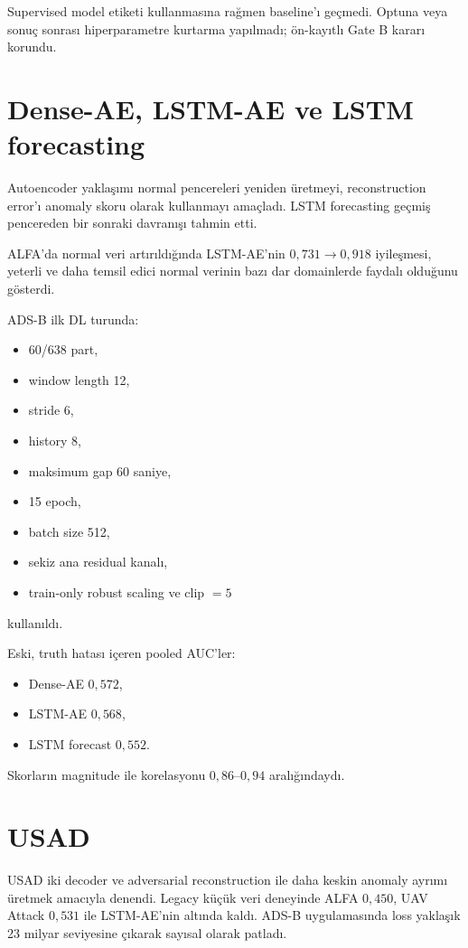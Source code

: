 \documentclass[11pt,a4paper,oneside]{report}
\begin{document}
Supervised model etiketi kullanmasına rağmen baseline'ı geçmedi. Optuna veya
sonuç sonrası hiperparametre kurtarma yapılmadı; ön-kayıtlı Gate B kararı
korundu.

\section{Dense-AE, LSTM-AE ve LSTM forecasting}

Autoencoder yaklaşımı normal pencereleri yeniden üretmeyi, reconstruction
error'ı anomaly skoru olarak kullanmayı amaçladı. LSTM forecasting geçmiş
pencereden bir sonraki davranışı tahmin etti.

ALFA'da normal veri artırıldığında LSTM-AE'nin \(0{,}731\to0{,}918\)
iyileşmesi, yeterli ve daha temsil edici normal verinin bazı dar domainlerde
faydalı olduğunu gösterdi.

ADS-B ilk DL turunda:

\begin{itemize}
  \item 60/638 part,
  \item window length 12,
  \item stride 6,
  \item history 8,
  \item maksimum gap 60 saniye,
  \item 15 epoch,
  \item batch size 512,
  \item sekiz ana residual kanalı,
  \item train-only robust scaling ve clip \(=5\)
\end{itemize}

kullanıldı.

Eski, truth hatası içeren pooled AUC'ler:

\begin{itemize}
  \item Dense-AE \(0{,}572\),
  \item LSTM-AE \(0{,}568\),
  \item LSTM forecast \(0{,}552\).
\end{itemize}

Skorların magnitude ile korelasyonu \(0{,}86\)--\(0{,}94\) aralığındaydı.

\section{USAD}

USAD iki decoder ve adversarial reconstruction ile daha keskin anomaly
ayrımı üretmek amacıyla denendi. Legacy küçük veri deneyinde ALFA \(0{,}450\),
UAV Attack \(0{,}531\) ile LSTM-AE'nin altında kaldı. ADS-B uygulamasında loss
yaklaşık 23 milyar seviyesine çıkarak sayısal olarak patladı.
\end{document}
